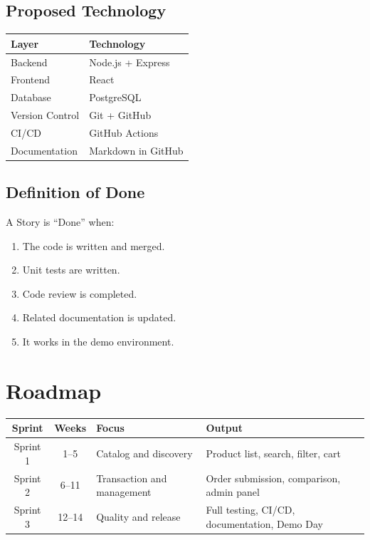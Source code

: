 \documentclass[12pt, a4paper]{article}
\begin{document}
\subsection{Proposed Technology}
\begin{center}
\begin{tabular}{|l|l|}
\hline
\textbf{Layer} & \textbf{Technology} \\
\hline
Backend & Node.js + Express \\
\hline
Frontend & React \\
\hline
Database & PostgreSQL \\
\hline
Version Control & Git + GitHub \\
\hline
CI/CD & GitHub Actions \\
\hline
Documentation & Markdown in GitHub \\
\hline
\end{tabular}
\end{center}

\subsection{Definition of Done}
A Story is ``Done'' when:
\begin{enumerate}
    \item The code is written and merged.
    \item Unit tests are written.
    \item Code review is completed.
    \item Related documentation is updated.
    \item It works in the demo environment.
\end{enumerate}

\section{Roadmap}

\begin{center}
\begin{tabular}{|c|c|p{4cm}|p{4.5cm}|}
\hline
\textbf{Sprint} & \textbf{Weeks} & \textbf{Focus} & \textbf{Output} \\
\hline
Sprint 1 & 1--5 & Catalog and discovery & Product list, search, filter, cart \\
\hline
Sprint 2 & 6--11 & Transaction and management & Order submission, comparison, admin panel \\
\hline
Sprint 3 & 12--14 & Quality and release & Full testing, CI/CD, documentation, Demo Day \\
\hline
\end{tabular}
\end{center}
\end{document}
